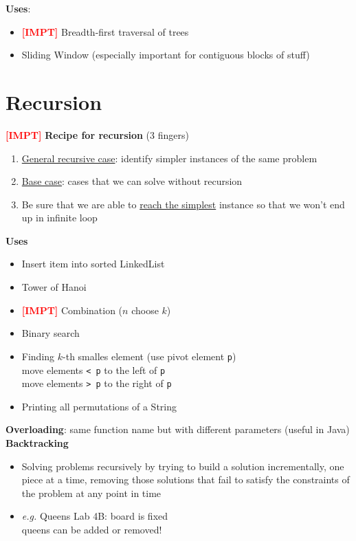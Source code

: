 \documentclass{article}
\newcommand{\eg}[0]{\textit{e.g. }}
\newcommand{\impt}[0]{\textcolor{red}{\textbf{[IMPT] }}}
\begin{document}
\begin{multicols}{2}
\textbf{Uses}:
\begin{itemize}
	\item \impt Breadth-first traversal of trees
	\item Sliding Window (especially important for contiguous blocks of stuff)
\end{itemize}
\section{Recursion}
\impt \textbf{Recipe for recursion} (3 fingers)
\begin{enumerate}
	\item \underline{General recursive case}: identify simpler instances of the same problem
	\item \underline{Base case}: cases that we can solve without recursion
	\item Be sure that we are able to \underline{reach the simplest} instance so that we won't end up in infinite loop
\end{enumerate}
\textbf{Uses}
\begin{itemize}
	\item Insert item into sorted LinkedList
	\item Tower of Hanoi
	\item \impt Combination ($n$ choose $k$)
	\item Binary search
	\item Finding $k$-th smalles element (use pivot element \texttt{p})\\
	move elements \texttt{< p} to the left of \texttt{p}\\
	move elements \texttt{> p} to the right of \texttt{p}
	\item Printing all permutations of a String
\end{itemize}
\textbf{Overloading}: same function name but with different parameters (useful in Java)\\
\textbf{Backtracking}
\begin{itemize}
	\item Solving problems recursively by trying to build a solution incrementally, one piece at a time, removing those solutions that fail to satisfy the constraints of the problem at any point in time
	\item \eg Queens Lab 4B: board is fixed\\
	queens can be added or removed!
\end{itemize}

\end{multicols}
\end{document}
